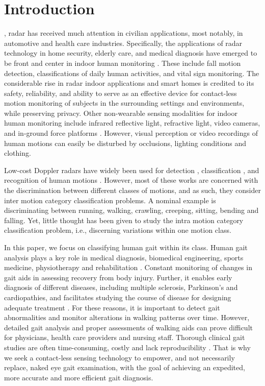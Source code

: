 \section{Introduction}

, radar has received much attention in civilian applications, most notably, in automotive and health care industries. Specifically, the applications of radar technology in home security, elderly care, and medical diagnosis have emerged to be front and center in indoor human monitoring \cite{Che14,Ami16,Ami17}. These include fall motion detection, classifications of daily human activities, and vital sign monitoring. The considerable rise in radar indoor applications and smart homes is credited to its safety, reliability, and ability to serve as an effective device for contact-less motion monitoring of subjects in the surrounding settings and environments, while preserving privacy. Other non-wearable sensing modalities for indoor human monitoring include infrared reflective light, refractive light, video cameras, and in-ground force platforms \cite{Sim04,Mur14}. However, visual perception or video recordings of human motions can easily be disturbed by occlusions, lighting conditions and clothing. 

Low-cost Doppler radars have widely been used for detection \cite{Wan14,Su15,Kim15,Cle15,Jok18}, classification \cite{Kim09,Bjoe15,Jok17}, and recognition of human motions \cite{Ric15}. However, most of these works are concerned with the discrimination between different classes of motions, and as such, they consider inter motion category classification problems. A nominal example is discriminating between running, walking, crawling, creeping, sitting, bending and falling. Yet, little thought has been given to study the intra motion category classification problem, i.e., discerning variations within one motion class.

In this paper, we focus on classifying human gait within its class. Human gait analysis plays a key role in medical diagnosis, biomedical engineering, sports medicine, physiotherapy and rehabilitation \cite{Mur14}. Constant monitoring of changes in gait aids in assessing recovery from body injury. Further, it enables early diagnosis of different diseases, including multiple sclerosis, Parkinson's and cardiopathies, and facilitates studying the course of disease for designing adequate treatment \cite{Mur14}. For these reasons, it is important to detect gait abnormalities and monitor alterations in walking patterns over time.
However, detailed gait analysis and proper assessments of walking aids can prove difficult for physicians, health care providers and nursing staff. Thorough clinical gait studies are often time-consuming, costly and lack reproducibility \cite{Sim04}. That is why we seek a contact-less sensing technology to empower, and not necessarily replace, naked eye gait examination, with the goal of achieving an expedited, more accurate and more efficient gait diagnosis. 

